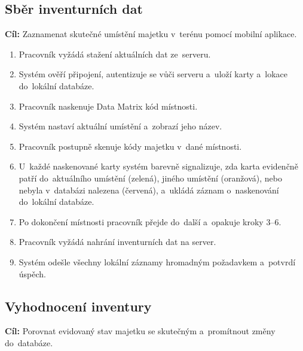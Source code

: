 \subsection{Sběr inventurních dat}

\textbf{Cíl:} Zaznamenat skutečné umístění majetku v~terénu pomocí mobilní aplikace.

\begin{enumerate}
	\item Pracovník vyžádá stažení aktuálních dat ze~serveru.
	\item Systém ověří připojení, autentizuje se vůči serveru a~uloží karty a~lokace do~lokální databáze.
	\item Pracovník naskenuje Data Matrix kód místnosti.
	\item Systém nastaví aktuální umístění a~zobrazí jeho název.
	\item Pracovník postupně skenuje kódy majetku v~dané místnosti.
	\item U~každé naskenované karty systém barevně signalizuje, zda karta evidenčně patří do~aktuálního umístění (zelená), jiného umístění (oranžová), nebo nebyla v~databázi nalezena (červená), a~ukládá záznam o~naskenování do~lokální databáze.
	\item Po dokončení místnosti pracovník přejde do~další a~opakuje kroky 3--6.
	\item Pracovník vyžádá nahrání inventurních dat na server.
	\item Systém odešle všechny lokální záznamy hromadným požadavkem a~potvrdí úspěch.
\end{enumerate}

\subsection{Vyhodnocení inventury}

\textbf{Cíl:} Porovnat evidovaný stav majetku se skutečným a~promítnout změny do~databáze.

